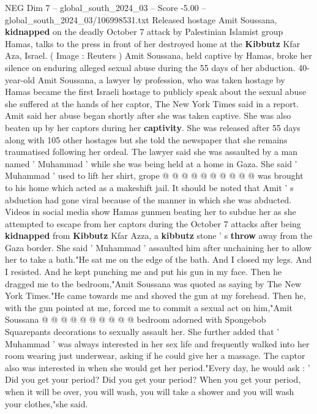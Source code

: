 \begin{textsample}{NEG Dim 7 – global\_south\_2024\_03 – Score -5.00 – global\_south\_2024\_03/106998531.txt}  \label{ex:f7_neg_421}
Released hostage Amit Soussana, \textbf{kidnapped} on the deadly October 7 attack by Palestinian Islamist group Hamas, talks to the press in front of her destroyed home at the \textbf{Kibbutz} Kfar Aza, Israel. ( Image : Reuters ) Amit Soussana, held captive by Hamas, broke her silence on enduring alleged sexual abuse during the 55 days of her abduction. 40-year-old Amit Soussana, a lawyer by profession, who was taken hostage by Hamas became the first Israeli hostage to publicly speak about the sexual abuse she suffered at the hands of her captor, The New York Times said in a report.
Amit said her abuse began shortly after she was taken captive.
She was also beaten up by her captors during her \textbf{captivity}.
She was released after 55 days along with 105 other hostages but she told the newspaper that she remains traumatised following her ordeal.
The lawyer said she was assaulted by a man named ' Muhammad ' while she was being held at a home in Gaza.
She said ' Muhammad ' used to lift her shirt, grope @ @ @ @ @ @ @ @ @ @ was brought to his home which acted as a makeshift jail.
It should be noted that Amit ' s abduction had gone viral because of the manner in which she was abducted.
Videos in social media show Hamas gunmen beating her to subdue her as she attempted to escape from her captors during the October 7 attacks after being \textbf{kidnapped} from \textbf{Kibbutz} Kfar Azza, a \textbf{kibbutz} stone ' s \textbf{throw} away from the Gaza border.
She said ' Muhammad ' assaulted him after unchaining her to allow her to take a bath."He sat me on the edge of the bath.
And I closed my legs.
And I resisted.
And he kept punching me and put his gun in my face.
Then he dragged me to the bedroom,"Amit Soussana was quoted as saying by The New York Times."He came towards me and shoved the gun at my forehead.
Then he, with the gun pointed at me, forced me to commit a sexual act on him,"Amit Soussana @ @ @ @ @ @ @ @ @ @ bedroom adorned with Spongebob Squarepants decorations to sexually assault her.
She further added that ' Muhammad ' was always interested in her sex life and frequently walked into her room wearing just underwear, asking if he could give her a massage.
The captor also was interested in when she would get her period."Every day, he would ask : ' Did you get your period?
Did you get your period?
When you get your period, when it will be over, you will wash, you will take a shower and you will wash your clothes,"she said.

\end{textsample}
